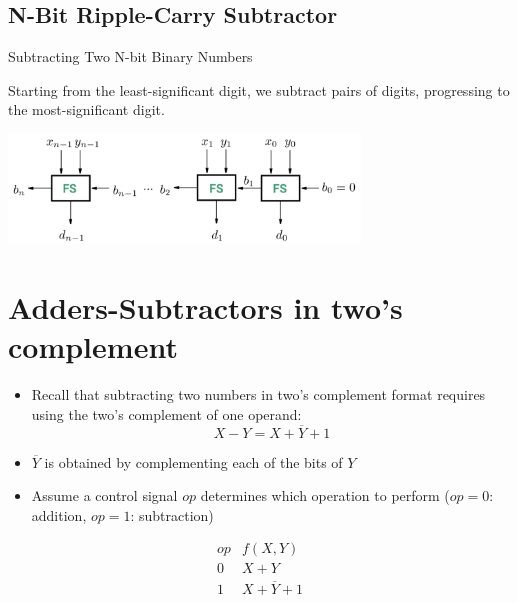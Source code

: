 \documentclass[12pt,openany, tikz,border=10pt]{book}
\begin{document}
\begin{itemize}
\begin{center}
    \end{center}
\end{itemize}

\subsection{N-Bit Ripple-Carry Subtractor}
Subtracting Two N-bit Binary Numbers

Starting from the least-significant digit, we subtract pairs of digits, progressing to the most-significant digit.

\begin{center}
    \begin{minipage}[c]{0.80\textwidth} %
        \centering
        \includegraphics[width=0.70\textwidth]{circuits/8.2.5.png} %
    \end{minipage}
  
    \end{center}

\newpage
\section{Adders-Subtractors in two's complement}
\begin{itemize}
    \item[] Recall that subtracting two numbers in two's complement format requires using the two's complement of one operand:
      \begin{equation*}
        X - Y = X + \overline{Y} + 1
      \end{equation*}
    \item[] $\overline{Y}$ is obtained by complementing each of the bits of $Y$
    \item[] Assume a control signal $op$ determines which operation to perform \newline($op = 0$: addition, $op = 1$: subtraction)
  \end{itemize}
  
  \[
  \begin{array}{c|c}
    op & f(X, Y) \\
    \hline
    0 & X + Y \\
    1 & X + \overline{Y} + 1
  \end{array}
  \]
  
\end{document}
